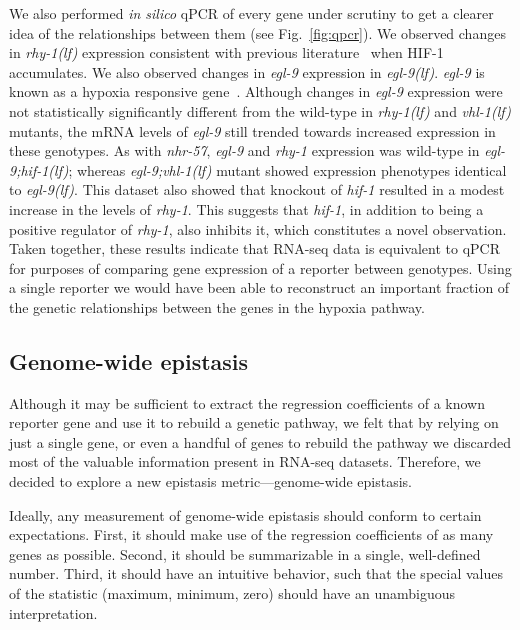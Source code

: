 \documentclass[9pt,twocolumn,twoside]{pnas-new}
\newcommand{\gene}[1]{\emph{#1}}
\newcommand{\nhr}{\emph{nhr-57}}
\newcommand{\egl}{\emph{egl-9(lf)}}
\newcommand{\rhy}{\emph{rhy-1(lf)}}
\newcommand{\vhl}{\emph{vhl-1(lf)}}
\newcommand{\eglvhl}{\emph{egl-9;vhl-1(lf)}}
\newcommand{\eglhif}{\emph{egl-9;hif-1(lf)}}
\newcommand{\hifp}{HIF-1}
\begin{document}
We also performed \emph{in silico} qPCR of every gene under scrutiny to get a
clearer idea of the relationships between them (see Fig.~\ref{fig:qpcr}). We
observed changes in \rhy{} expression consistent with previous
literature~\cite{Shen2006} when \hifp{} accumulates.
We also observed changes in \gene{egl-9} expression in \egl{}.
\gene{egl-9} is known as a hypoxia responsive gene~\cite{Powell-Coffman2010}.
Although changes in \gene{egl-9} expression were not statistically significantly
different from the wild-type in
\rhy{} and \vhl{} mutants, the mRNA levels of \gene{egl-9} still trended towards
increased expression in these genotypes. As with \nhr{}, \gene{egl-9} and
\gene{rhy-1} expression was wild-type in \eglhif{}; whereas \eglvhl{}
mutant showed expression phenotypes identical to \egl{}. This dataset also showed
that knockout of \gene{hif-1} resulted in a modest increase in
the levels of \gene{rhy-1}. This suggests that \gene{hif-1}, in addition to being
a positive regulator of \gene{rhy-1}, also inhibits it, which constitutes a novel
observation. Taken together, these results indicate that RNA-seq data is
equivalent to qPCR for purposes of comparing gene expression of a reporter between
genotypes. Using a single reporter we would have been able to reconstruct an
important fraction of the genetic relationships between the genes in the hypoxia
pathway.

\subsection*{Genome-wide epistasis}
Although it may be sufficient to extract the regression coefficients of a
known reporter gene and use it to rebuild a genetic pathway, we felt that by
relying on just a single gene, or even a handful of genes to rebuild the pathway
we discarded most of the valuable information present in RNA-seq datasets. Therefore,
we decided to explore a new epistasis metric---genome-wide epistasis.

Ideally, any measurement of genome-wide epistasis should conform to certain
expectations. First, it should make use of the regression coefficients of as
many genes as possible. Second, it should be summarizable in a single,
well-defined number. Third, it should have an intuitive behavior, such that
the special values of the statistic (maximum, minimum, zero) should have an
unambiguous interpretation.
\end{document}
